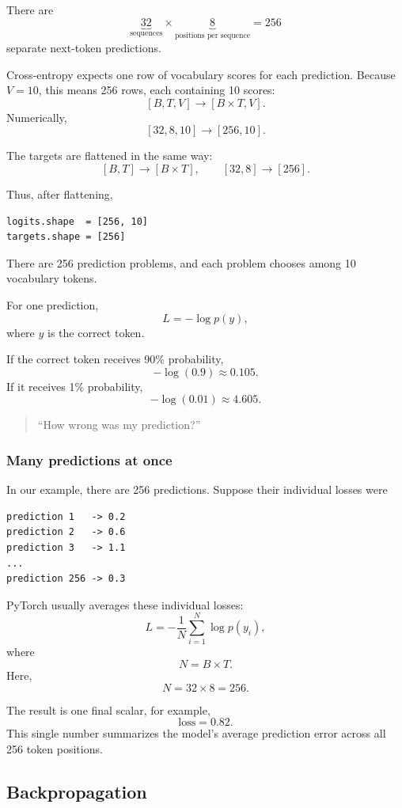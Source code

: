 There are
\[
  \underbrace{32}_{\text{sequences}}
  \times
  \underbrace{8}_{\text{positions per sequence}}
  =256
\]
separate next-token predictions.

Cross-entropy expects one row of vocabulary scores for each prediction.
Because \(V=10\), this means 256 rows, each containing 10 scores:
\[
  [B,T,V]\longrightarrow[B\times T,V].
\]
Numerically,
\[
  [32,8,10]\longrightarrow[256,10].
\]

The targets are flattened in the same way:
\[
  [B,T]\longrightarrow[B\times T],
  \qquad
  [32,8]\longrightarrow[256].
\]

Thus, after flattening,
\begin{lstlisting}[style=shadedpython]
logits.shape  = [256, 10]
targets.shape = [256]
\end{lstlisting}
There are 256 prediction problems, and each problem chooses among 10
vocabulary tokens.

For one prediction,
\[
  L=-\log p(y),
\]
where \(y\) is the correct token. 

If the correct token receives 90\% probability,
\[
  -\log(0.9)\approx0.105.
\]
If it receives 1\% probability,
\[
  -\log(0.01)\approx4.605.
\]

\begin{quote}
  ``How wrong was my prediction?''
\end{quote}

\subsubsection*{Many predictions at once}

In our example, there are 256 predictions. Suppose their individual losses
were
\begin{lstlisting}[style=shadedpython,language={}]
prediction 1   -> 0.2
prediction 2   -> 0.6
prediction 3   -> 1.1
...
prediction 256 -> 0.3
\end{lstlisting}

PyTorch usually averages these individual losses:
\[
  L=-\frac{1}{N}\sum_{i=1}^{N}\log p(y_i),
\]
where
\[
  N=B\times T.
\]
Here,
\[
  N=32\times8=256.
\]

The result is one final scalar, for example,
\[
  \text{loss}=0.82.
\]
This single number summarizes the model's average prediction error across all
256 token positions.

\subsection{Backpropagation}

